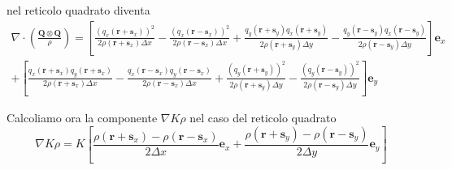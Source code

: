 \documentclass[a4paper,11pt]{article}
\begin{document}
nel reticolo quadrato diventa
\[
\begin{array}{r}
	\nabla \cdot \left( \frac{\mathbf{Q} \otimes \mathbf{Q}}{\rho} \right)
	= \left[
	\frac{(q_x(\mathbf{r}+\mathbf{s}_x))^2}{2 \rho(\mathbf{r}+\mathbf{s}_x) \Delta x}
	-\frac{(q_x(\mathbf{r}-\mathbf{s}_x))^2}{2 \rho(\mathbf{r}-\mathbf{s}_x) \Delta x}
	+ \frac{q_y(\mathbf{r}+\mathbf{s}_y) q_x(\mathbf{r}+\mathbf{s}_y)}{2 \rho(\mathbf{r}+\mathbf{s}_y) \Delta y}
	- \frac{q_y(\mathbf{r}-\mathbf{s}_y) q_x(\mathbf{r}-\mathbf{s}_y)}{2 \rho(\mathbf{r}-\mathbf{s}_y) \Delta y}
	\right] \mathbf{e}_x
	\\
	+ \left[
	\frac{q_x(\mathbf{r}+\mathbf{s}_x) q_y(\mathbf{r}+\mathbf{s}_x)}{2 \rho(\mathbf{r}+\mathbf{s}_x) \Delta x}
	-\frac{q_x(\mathbf{r}-\mathbf{s}_x) q_y(\mathbf{r}-\mathbf{s}_x)}{2 \rho(\mathbf{r}-\mathbf{s}_x) \Delta x}
	+ \frac{(q_y(\mathbf{r}+\mathbf{s}_y))^2}{2 \rho(\mathbf{r}+\mathbf{s}_y) \Delta y}
	- \frac{(q_y(\mathbf{r}-\mathbf{s}_y))^2}{2 \rho(\mathbf{r}-\mathbf{s}_y) \Delta y}
	\right] \mathbf{e}_y
\end{array}
\]

Calcoliamo ora la componente $ \nabla K \rho $ nel caso del reticolo quadrato
\[
	\nabla K \rho
	= K \left[
	\frac{\rho (\mathbf{r}+\mathbf{s}_x) - \rho (\mathbf{r}-\mathbf{s}_x)}{2 \Delta x} \mathbf{e}_x
	+ \frac{\rho (\mathbf{r}+\mathbf{s}_y) - \rho (\mathbf{r}-\mathbf{s}_y)}{2 \Delta y} \mathbf{e}_y
	\right]
\]
\end{document}
